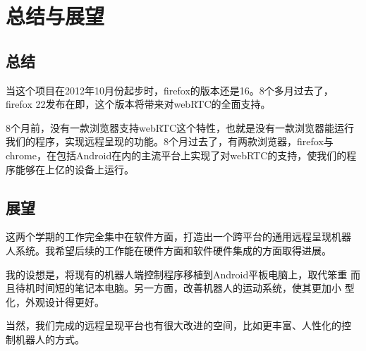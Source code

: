 \chapter{总结与展望}

\section{总结}

当这个项目在2012年10月份起步时，firefox的版本还是16。8个多月过去了，
firefox 22发布在即，这个版本将带来对webRTC的全面支持。

8个月前，没有一款浏览器支持webRTC这个特性，也就是没有一款浏览器能运行
我们的程序，实现远程呈现的功能。8个月过去了，有两款浏览器，firefox与
chrome，在包括Android在内的主流平台上实现了对webRTC的支持，使我们的程
序能够在上亿的设备上运行。

\section{展望}

这两个学期的工作完全集中在软件方面，打造出一个跨平台的通用远程呈现机器
人系统。我希望后续的工作能在硬件方面和软件硬件集成的方面取得进展。

我的设想是，将现有的机器人端控制程序移植到Android平板电脑上，取代笨重
而且待机时间短的笔记本电脑。另一方面，改善机器人的运动系统，使其更加小
型化，外观设计得更好。

当然，我们完成的远程呈现平台也有很大改进的空间，比如更丰富、人性化的控
制机器人的方式。
